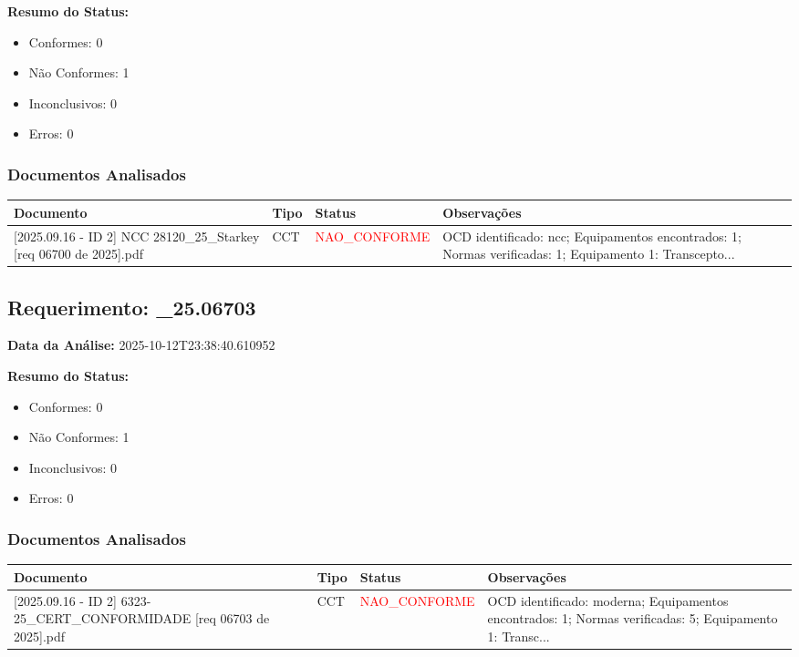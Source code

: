\documentclass[12pt,a4paper]{article}
\begin{document}
\textbf{Resumo do Status:}
\begin{itemize}
    \item Conformes: 0
    \item Não Conformes: 1
    \item Inconclusivos: 0
    \item Erros: 0
\end{itemize}

\subsubsection{Documentos Analisados}

\begin{longtable}{|p{4cm}|p{2cm}|p{2cm}|p{6cm}|}
\hline
\textbf{Documento} & \textbf{Tipo} & \textbf{Status} & \textbf{Observações} \\
\hline
\endhead
[Certificado de Conformidade Técnica - CCT][2025.09.16 - ID 2] NCC 28120\_25\_Starkey [req 06700 de  2025].pdf & CCT & \textcolor{red}{NAO\_CONFORME} & OCD identificado: ncc; Equipamentos encontrados: 1; Normas verificadas: 1; Equipamento 1: Transcepto... \\
\hline
\end{longtable}


\subsection{Requerimento: \_25.06703}

\textbf{Data da Análise:} 2025-10-12T23:38:40.610952

\textbf{Resumo do Status:}
\begin{itemize}
    \item Conformes: 0
    \item Não Conformes: 1
    \item Inconclusivos: 0
    \item Erros: 0
\end{itemize}

\subsubsection{Documentos Analisados}

\begin{longtable}{|p{4cm}|p{2cm}|p{2cm}|p{6cm}|}
\hline
\textbf{Documento} & \textbf{Tipo} & \textbf{Status} & \textbf{Observações} \\
\hline
\endhead
[Certificado de Conformidade Técnica - CCT][2025.09.16 - ID 2] 6323-25\_CERT\_CONFORMIDADE [req 06703 de  2025].pdf & CCT & \textcolor{red}{NAO\_CONFORME} & OCD identificado: moderna; Equipamentos encontrados: 1; Normas verificadas: 5; Equipamento 1: Transc... \\
\hline
\end{longtable}
\end{document}
